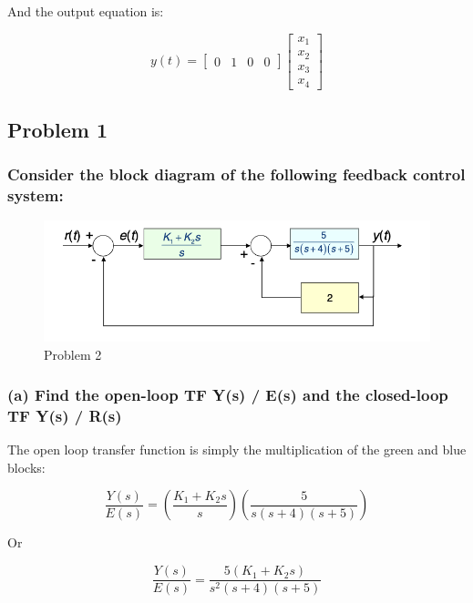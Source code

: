 \documentclass[12pt, letterpaper]{../assignment}
\begin{document}
And the output equation is:

\begin{answer}
    \begin{equation*}
        y(t)=
        \begin{bmatrix}
            0 & 1 & 0 & 0
        \end{bmatrix}
        \begin{bmatrix}
            x_1\\ x_2\\ x_3\\ x_4
        \end{bmatrix}
    \end{equation*}
\end{answer}


\subsection*{Problem 1}
\subsubsection*{Consider the block diagram of the following feedback control system:}


\begin{figure}[H]
    \centering
    \includegraphics[scale=1]{figures/problem2.png}
    \caption{Problem 2}
    \label{Fig:prob2}
\end{figure}

\subsubsection*{(a) Find the open-loop TF Y(s) / E(s) and the closed-loop TF Y(s) / R(s)}

The open loop transfer function is simply the multiplication of the green and blue blocks:

$$ \frac{Y(s)}{E(s)} = \left(\frac{K_1 + K_2 s}{s}\right) \left(\frac{5}{s(s+4)(s+5)}\right) $$

Or
\begin{answer}
    $$ \frac{Y(s)}{E(s)} = \frac{5(K_1 + K_2 s)}{s^2(s+4)(s+5)} $$
\end{answer}
\end{document}
